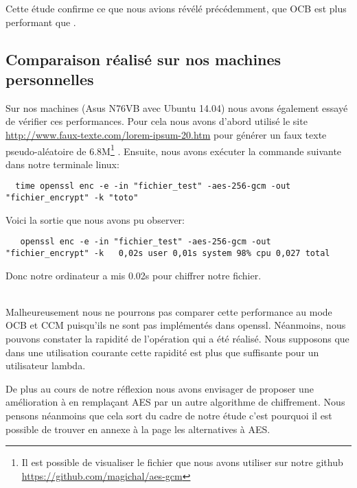 Cette étude confirme ce que nous avions révélé précédemment, \cad que OCB est plus performant que \aes.%


\subsection{Comparaison réalisé sur nos machines personnelles}



Sur nos machines (Asus N76VB avec Ubuntu 14.04) nous avons également essayé de vérifier ces performances. Pour cela nous avons d'abord utilisé le site \url{http://www.faux-texte.com/lorem-ipsum-20.htm} pour générer un faux texte pseudo-aléatoire de 6.8M\footnote{Il est possible de visualiser le fichier que nous avons utiliser sur notre github \url{https://github.com/magichal/aes-gcm}} . Ensuite, nous avons exécuter la commande suivante dans notre terminale linux:

\begin{lstlisting}
  time openssl enc -e -in "fichier_test" -aes-256-gcm -out "fichier_encrypt" -k "toto"
\end{lstlisting}

  Voici la sortie que nous avons pu observer:

  \begin{lstlisting}
   openssl enc -e -in "fichier_test" -aes-256-gcm -out "fichier_encrypt" -k   0,02s user 0,01s system 98% cpu 0,027 total
  \end{lstlisting}

Donc notre ordinateur a mis 0.02s pour chiffrer notre fichier.

~\\

Malheureusement nous ne pourrons pas comparer cette performance au mode OCB et CCM puisqu'ils ne sont pas implémentés dans openssl. Néanmoins, nous pouvons constater la rapidité de l'opération qui a été réalisé. Nous supposons que dans une utilisation courante cette rapidité est plus que suffisante pour un utilisateur lambda.

De plus au cours de notre réflexion nous avons envisager de proposer une amélioration à \aes en remplaçant AES par un autre algorithme de chiffrement. Nous pensons néanmoins que cela sort du cadre de notre étude c'est pourquoi il est possible de trouver en annexe à la page \pageref{anexe1} les alternatives à AES.




